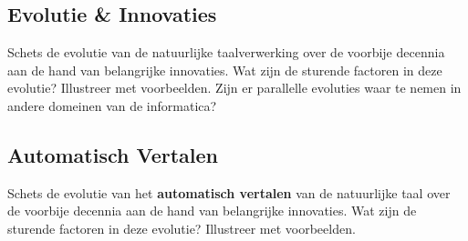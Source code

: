 \documentclass[../main.tex]{subfiles}
\begin{document}
\subsection{Evolutie \& Innovaties}
\begin{question}
Schets de evolutie van de natuurlijke taalverwerking over de voorbije decennia aan de hand van belangrijke innovaties. Wat zijn de sturende factoren in deze evolutie? Illustreer met voorbeelden.
Zijn er parallelle evoluties waar te nemen in andere domeinen van de informatica?
\end{question}

\subsection{Automatisch Vertalen}
\begin{question}
Schets de evolutie van het \textbf{automatisch vertalen} van de natuurlijke taal over de voorbije decennia aan de hand van belangrijke innovaties.
Wat zijn de sturende factoren in deze evolutie?
Illustreer met voorbeelden.
\end{question}
\end{document}
